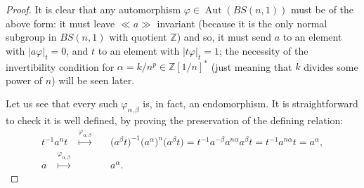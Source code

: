 \documentclass[english]{amsart}
\theoremstyle{definition}
\newcommand\ZZ{\mathbb{Z}}
\newcommand{\Aut}{\operatorname{Aut}}
\newcommand{\ncl}[1]{\ll \!#1 \!\gg}
\begin{document}
\begin{proof}

It is clear that any automorphism $\varphi\in \Aut(BS(n,1))$ must be of the above form: it must leave $\ncl{a}$ invariant (because it is the only normal subgroup in $BS(n,1)$ with quotient $\ZZ$) and so, it must send $a$ to an element with $|a\varphi|_t=0$, and $t$ to an element with $|t\varphi|_t=1$; the necessity of the invertibility condition for $\alpha=k/n^p\in \ZZ[1/n]^*$ (just meaning that $k$ divides some power of $n$) will be seen later. 

Let us see that every such $\varphi_{\alpha, \beta}$ is, in fact, an endomorphism. It is straightforward to check it is well defined, by proving the preservation of the defining relation:
 \begin{align*}
t^{-1}a^nt \stackrel{\varphi_{\alpha,\beta}}{\quad \mapsto\quad} &\big( a^{\beta} t\big)^{-1} \big( a^{\alpha}\big)^n \big( a^{\beta} t\big)= t^{-1} a^{-\beta} a^{n\alpha} a^{\beta}t= t^{-1} a^{n\alpha} t =a^{\alpha},
\\ a \stackrel{\varphi_{\alpha,\beta}}{\quad \mapsto\quad} & a^{\alpha}. 
 \end{align*}


\end{proof}
\end{document}
